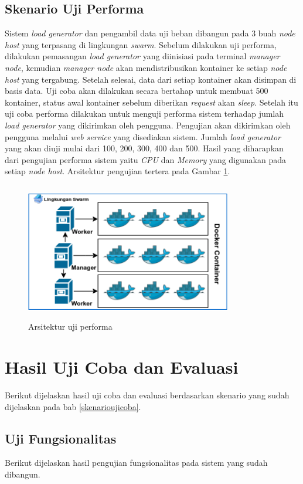 	\subsection{Skenario Uji Performa} \label{skenujiperforma}
		Sistem \textit{load generator} dan pengambil data uji beban dibangun pada 3 buah \textit{node host} yang terpasang di lingkungan \textit{swarm}.  Sebelum dilakukan uji performa, dilakukan pemasangan \textit{load generator} yang diinisiasi pada terminal \textit{manager node}, kemudian \textit{manager node} akan mendistribusikan kontainer ke setiap \textit{node host} yang tergabung. Setelah selesai, data dari setiap kontainer akan disimpan di basis data. Uji coba akan dilakukan secara bertahap untuk membuat 500 kontainer, status awal kontainer sebelum diberikan \textit{request} akan \textit{sleep}. Setelah itu uji coba performa dilakukan untuk menguji performa sistem terhadap jumlah \textit{load generator} yang dikirimkan oleh pengguna. Pengujian akan dikirimkan oleh pengguna melalui \textit{web service} yang disediakan sistem. Jumlah \textit{load generator} yang akan diuji mulai dari 100, 200, 300, 400 dan 500. Hasil yang diharapkan dari pengujian performa sistem yaitu \textit{CPU} dan \textit{Memory} yang digunakan pada setiap \textit{node host}. Arsitektur pengujian tertera pada Gambar \ref{ujiperforma}.
		\begin{figure}[H]
			\centering
			\includegraphics[width=9cm,height=6cm]{Images/C-5/performa.png}
			\caption{Arsitektur uji performa}
			\label{ujiperforma}
		\end{figure}
	
	\section{Hasil Uji Coba dan Evaluasi}
		Berikut dijelaskan hasil uji coba dan evaluasi berdasarkan skenario yang sudah dijelaskan pada bab \ref{skenarioujicoba}.
		
		\subsection{Uji Fungsionalitas}
			Berikut dijelaskan hasil pengujian fungsionalitas pada sistem yang sudah dibangun.
			
